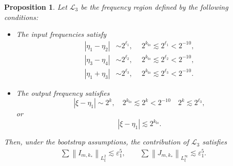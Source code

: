 \documentclass[reqno,english,11pt]{amsart}
\newcommand{\eps}{\varepsilon}
\newcommand{\snorm}[1]{\left\|#1\right\|}
\newtheorem{proposition}[theorem]{Proposition}
\theoremstyle{definition}
\numberwithin{equation}{section}
\begin{document}
\begin{proposition}\label{prop:STR_line_case_3}
Let $\mathcal{L}_3$ be the frequency region defined by the following conditions:
\begin{itemize}
    \item The input frequencies satisfy
\begin{align*}
  \left|\eta_1-\eta_2\right| &\sim 2^{\ell_1}, \quad  \ 2^{k_{\operatorname{lo}}} \lesssim 2^{\ell_1}<2^{-10},
  \\
  \left|\eta_3-\eta_4\right| &\sim 2^{\ell_2}, \quad  \ 2^{k_{\operatorname{lo}}} \lesssim 2^{\ell_2}<2^{-10},
  \\
  \left|\eta_1+\eta_3\right| &\sim 2^{\ell_3}, \quad  \ 2^{k_{\operatorname{lo}}} \lesssim 2^{\ell_3}<2^{-10}.
\end{align*}
    \item The output frequency satisfies 
    $$ |\xi-\eta_1|\sim 2^{k}, \quad 2^{k_{\operatorname{lo}}} \lesssim 2^{k}<2^{-10} \quad 2^{k}\lesssim 2^{\ell_3},$$
    or
    $$|\xi-\eta_1|\lesssim 2^{k_{\operatorname{lo}}}.$$
\end{itemize}
Then, under the bootstrap assumptions, the contribution of $\mathcal{L}_3$ satisfies
    \begin{align*}
        \sum\snorm{I_{m,k_*}}_{L^2_\xi}\lesssim \eps_1^5,\qquad
        \sum\snorm{J_{m,k_*}}_{L^\infty_\xi}\lesssim \eps_1^5.
    \end{align*}
\end{proposition}
\end{document}
